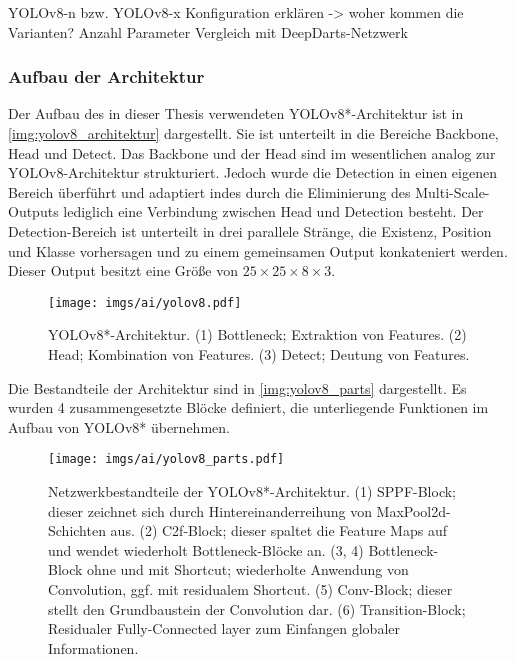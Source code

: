 YOLOv8-n bzw. YOLOv8-x
Konfiguration erklären -> woher kommen die Varianten?
Anzahl Parameter
Vergleich mit DeepDarts-Netzwerk


\subsubsection{Aufbau der Architektur}

Der Aufbau des in dieser Thesis verwendeten YOLOv8*-Architektur ist in \autoref{img:yolov8_architektur} dargestellt. Sie ist unterteilt in die Bereiche Backbone, Head und Detect. Das Backbone und der Head sind im wesentlichen analog zur YOLOv8-Architektur strukturiert. Jedoch wurde die Detection in einen eigenen Bereich überführt und adaptiert indes durch die Eliminierung des Multi-Scale-Outputs lediglich eine Verbindung zwischen Head und Detection besteht. Der Detection-Bereich ist unterteilt in drei parallele Stränge, die Existenz, Position und Klasse vorhersagen und zu einem gemeinsamen Output konkateniert werden. Dieser Output besitzt eine Größe von $25 \times 25 \times 8 \times 3$.

\begin{figure}
    \centering
    \texttt{[image: imgs/ai/yolov8.pdf]}
    \caption{YOLOv8*-Architektur. (1) Bottleneck; Extraktion von Features. (2) Head; Kombination von Features. (3) Detect; Deutung von Features.}
    \label{img:yolov8_architektur}
\end{figure}

Die Bestandteile der Architektur sind in \autoref{img:yolov8_parts} dargestellt. Es wurden 4 zusammengesetzte Blöcke definiert, die unterliegende Funktionen im Aufbau von YOLOv8* übernehmen.

\begin{figure}
    \centering
    \texttt{[image: imgs/ai/yolov8\_parts.pdf]}
    \caption{Netzwerkbestandteile der YOLOv8*-Architektur. (1) SPPF-Block; dieser zeichnet sich durch Hintereinanderreihung von MaxPool2d-Schichten aus. (2) C2f-Block; dieser spaltet die Feature Maps auf und wendet wiederholt Bottleneck-Blöcke an. (3, 4) Bottleneck-Block ohne und mit Shortcut; wiederholte Anwendung von Convolution, ggf. mit residualem Shortcut. (5) Conv-Block; dieser stellt den Grundbaustein der Convolution dar. (6) Transition-Block; Residualer Fully-Connected layer zum Einfangen globaler Informationen.}
    \label{img:yolov8_parts}
\end{figure}

